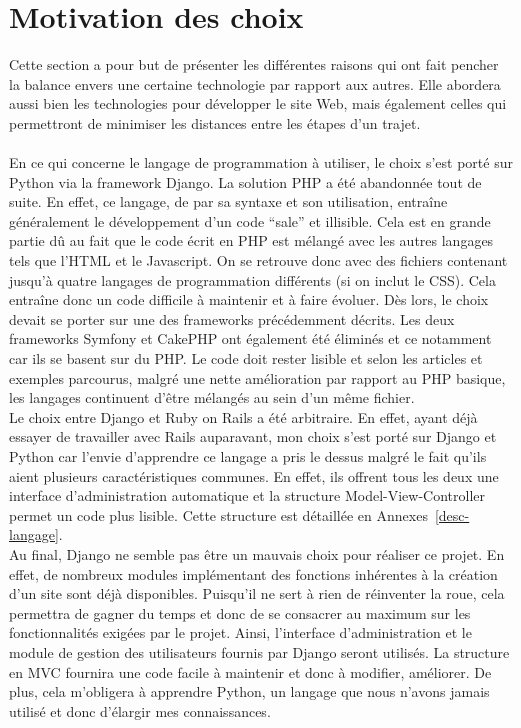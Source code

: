 \documentclass[12pt, a4paper, oneside]{article}
\begin{document}
\section{Motivation des choix}
    Cette section a pour but de présenter les différentes raisons qui ont fait pencher la balance envers une certaine technologie par rapport aux autres. Elle abordera aussi bien les technologies pour développer le site Web, mais également celles qui permettront de minimiser les distances entre les étapes d'un trajet.\\\\
    \indent En ce qui concerne le langage de programmation à utiliser, le choix s'est porté sur Python via la framework Django. La solution PHP a été abandonnée tout de suite. En effet, ce langage, de par sa syntaxe et son utilisation, entraîne généralement le développement d'un code ``sale'' et illisible. Cela est en grande partie dû au fait que le code écrit en PHP est mélangé avec les autres langages tels que l'HTML et le Javascript. On se retrouve donc avec des fichiers contenant jusqu'à quatre langages de programmation différents (si on inclut le CSS). Cela entraîne donc un code difficile à maintenir et à faire évoluer. Dès lors, le choix devait se porter sur une des frameworks précédemment décrits. Les deux frameworks Symfony et CakePHP ont également été éliminés et ce notamment car ils se basent sur du PHP. Le code doit rester lisible et selon les articles et exemples parcourus, malgré une nette amélioration par rapport au PHP basique, les langages continuent d'être mélangés au sein d'un même fichier.\\
    \indent Le choix entre Django et Ruby on Rails a été arbitraire. En effet, ayant déjà essayer de travailler avec Rails auparavant, mon choix s'est porté sur Django et Python car l'envie d'apprendre ce langage a pris le dessus malgré le fait qu'ils aient plusieurs caractéristiques communes. En effet, ils offrent tous les deux une interface d'administration automatique et la structure Model-View-Controller permet un code plus lisible. Cette structure est détaillée en Annexes~\ref{desc-langage}.\\
    \indent Au final, Django ne semble pas être un mauvais choix pour réaliser ce projet. En effet, de nombreux modules implémentant des fonctions inhérentes à la création d'un site sont déjà disponibles. Puisqu'il ne sert à rien de réinventer la roue, cela permettra de gagner du temps et donc de se consacrer au maximum sur les fonctionnalités exigées par le projet. Ainsi, l'interface d'administration et le module de gestion des utilisateurs fournis par Django seront utilisés. La structure en MVC fournira une code facile à maintenir et donc à modifier, améliorer. De plus, cela m'obligera à apprendre Python, un langage que nous n'avons jamais utilisé et donc d'élargir mes connaissances.\\\\
\end{document}
